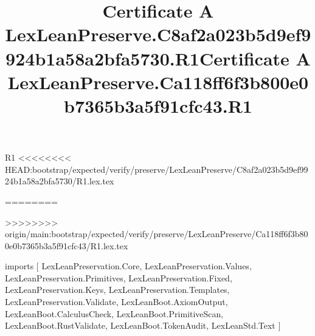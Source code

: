 \begin{lexlean}{R1}
<<<<<<<< HEAD:bootstrap/expected/verify/preserve/LexLeanPreserve/C8af2a023b5d9ef9924b1a58a2bfa5730/R1.lex.tex
\title{Certificate A LexLeanPreserve.C8af2a023b5d9ef9924b1a58a2bfa5730.R1}
========
\title{Certificate A LexLeanPreserve.Ca118ff6f3b800e0b7365b3a5f91cfc43.R1}
>>>>>>>> origin/main:bootstrap/expected/verify/preserve/LexLeanPreserve/Ca118ff6f3b800e0b7365b3a5f91cfc43/R1.lex.tex
\begin{coremodule}
imports [
  LexLeanPreservation.Core,
  LexLeanPreservation.Values,
  LexLeanPreservation.Primitives,
  LexLeanPreservation.Fixed,
  LexLeanPreservation.Keys,
  LexLeanPreservation.Templates,
  LexLeanPreservation.Validate,
  LexLeanBoot.AxiomOutput,
  LexLeanBoot.CalculusCheck,
  LexLeanBoot.PrimitiveScan,
  LexLeanBoot.RustValidate,
  LexLeanBoot.TokenAudit,
  LexLeanStd.Text
]


\end{coremodule}
\end{lexlean}
